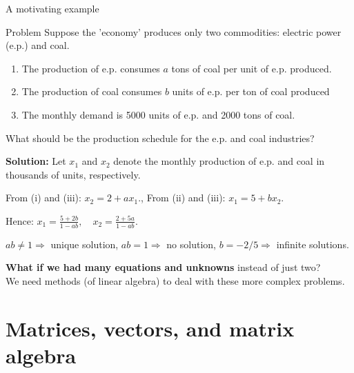 \documentclass[9pt]{beamer}
\begin{document}
\begin{frame}{A motivating example}

    \begin{block}{Problem}
Suppose the 'economy' produces only two commodities: electric power (e.p.) and coal.

\begin{enumerate}[leftmargin = 0.8cm, label = (\roman*), rightmargin = 0.2cm]
\item The production of e.p. consumes \(a\) tons of coal per unit of e.p. produced.

\item The production of coal consumes \(b\) units of e.p. per ton of coal produced %

\item The monthly demand is 5000 units of e.p. and 2000 tons of coal.
\end{enumerate}
What should be the production schedule for the e.p. and coal industries?

\end{block}

\textbf{Solution:} Let \(x_1\) and \(x_2\) denote the monthly production of e.p. and coal in thousands of units, respectively.

From (i) and (iii):  
\(x_2 = 2 + ax_1.\),\quad 
From (ii) and (iii):  
\(x_1 = 5 + bx_2.\)

Hence:
\(
x_1 = \frac{5 + 2b}{1 - ab},\quad x_2 = \frac{2 + 5a}{1 - ab}.
\)

\(ab \neq 1 \Rightarrow\) unique solution, \(ab = 1 \Rightarrow\) no solution, \(b = -2/5 \Rightarrow\) infinite solutions.

\textbf{What if we had many equations and unknowns} instead of just two? \\
We need methods (of linear algebra) to deal with these more complex problems.
    
\end{frame}


\section{Matrices, vectors, and matrix algebra}
\end{document}
